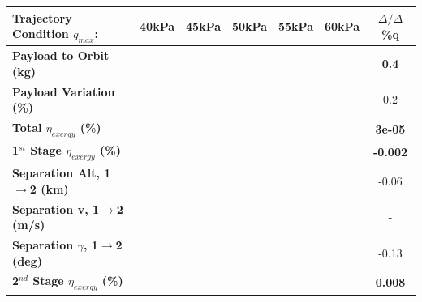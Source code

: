 \begin{table}[ht!]
	\centering
	\begin{tabular}{l c c c c c c} 
		\hline \textbf{Trajectory Condition  \qquad  $q_{max}$: }
		&40kPa
		&45kPa
		&50kPa
		& 55kPa
		& 60kPa
		& $\Delta/\Delta$\%q
	\\
	\hline \textbf{Payload to Orbit (kg)}
	& \textbf{\PayloadToOrbitqFortyNoReturn}
	& \textbf{\PayloadToOrbitqFortyFiveNoReturn}
	& \textbf{\PayloadToOrbitqStandardNoReturn}
	& \textbf{\PayloadToOrbitqFiftyFiveNoReturn}
	& \textbf{\PayloadToOrbitqSixtyNoReturn}
	&\textbf{0.4}
	\\
	\textbf{Payload Variation (\%)}
	& \PayloadVarqFortyNoReturn
	& \PayloadVarqFortyFiveNoReturn
	& \PayloadVarqStandardNoReturn
	& \PayloadVarqFiftyFiveNoReturn
	& \PayloadVarqSixtyNoReturn
	&0.2
	\\
	\textbf{Total $\eta_{exergy}$ (\%)}
	& \textbf{\totalExergyEffqFortyNoReturn}
	& \textbf{\totalExergyEffqFortyFiveNoReturn}
	& \textbf{\totalExergyEffqStandardNoReturn}
	& \textbf{\totalExergyEffqFiftyFiveNoReturn}
	& \textbf{\totalExergyEffqSixtyNoReturn}
	& \textbf{3e-05}
	\\
	\hline 
	\textbf{1$^{st}$ Stage $\eta_{exergy}$ (\%)}
	& \textbf{\firstExergyEffqFortyNoReturn}
	& \textbf{\firstExergyEffqFortyFiveNoReturn}
	& \textbf{\firstExergyEffqStandardNoReturn}
	& \textbf{\firstExergyEffqFiftyFiveNoReturn}
	& \textbf{\firstExergyEffqSixtyNoReturn}
	& \textbf{-0.002}
	\\

	\textbf{Separation Alt, 1$\rightarrow$2 (km)}
	& \firstsecondSeparationAltqFortyNoReturn
	& \firstsecondSeparationAltqFortyFiveNoReturn
	& \firstsecondSeparationAltqStandardNoReturn
	& \firstsecondSeparationAltqFiftyFiveNoReturn
	& \firstsecondSeparationAltqSixtyNoReturn
	&-0.06
	\\
	\textbf{Separation v, 1$\rightarrow$2 (m/s)}
	& \firstsecondSeparationvqFortyNoReturn
	& \firstsecondSeparationvqFortyFiveNoReturn
	& \firstsecondSeparationvqStandardNoReturn
	& \firstsecondSeparationvqFiftyFiveNoReturn
	& \firstsecondSeparationvqSixtyNoReturn
	& -
	\\
	\textbf{Separation $\gamma$, 1$\rightarrow$2 (deg)}
	& \firstsecondSeparationgammaqFortyNoReturn
	& \firstsecondSeparationgammaqFortyFiveNoReturn
	& \firstsecondSeparationgammaqStandardNoReturn
	& \firstsecondSeparationgammaqFiftyFiveNoReturn
	& \firstsecondSeparationgammaqSixtyNoReturn
	&-0.13
	\\
	\hline 
	\textbf{2$^{nd}$ Stage $\eta_{exergy}$ (\%)}
	& \textbf{\secondExergyEffqFortyNoReturn}
	& \textbf{\secondExergyEffqFortyFiveNoReturn}
	& \textbf{\secondExergyEffqStandardNoReturn}
	& \textbf{\secondExergyEffqFiftyFiveNoReturn}
	& \textbf{\secondExergyEffqSixtyNoReturn}
	& \textbf{0.008}
	\\


\end{tabular}
\end{table}
